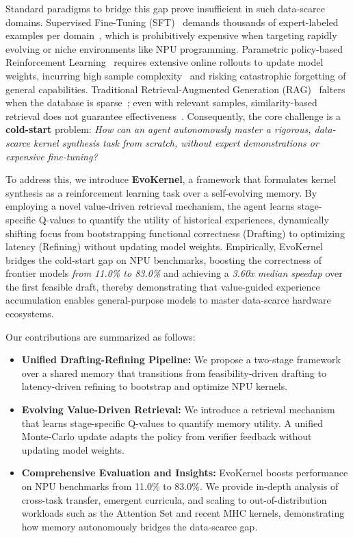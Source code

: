 \documentclass{article} %
\newcommand{\ourmethod}{EvoKernel\xspace}
\theoremstyle{definition}
\theoremstyle{remark}
\begin{document}
Standard paradigms to bridge this gap prove insufficient in such data-scarce domains. Supervised Fine-Tuning (SFT)~\citep{zhou2023lima, chung2024scaling} demands thousands of expert-labeled examples per domain~\citep{longpre2023flan}, which is prohibitively expensive when targeting rapidly evolving or niche environments like NPU programming. Parametric policy-based Reinforcement Learning~\citep{zhang2025settling, kakade2003sample} requires extensive online rollouts to update model weights, incurring high sample complexity~\citep{cao2024beyond, qi2025sample} and risking catastrophic forgetting of general capabilities. Traditional Retrieval-Augmented Generation (RAG)~\citep{lewis2020retrieval} falters when the database is sparse~\citep{contal2024ragsys, barnett2024seven}; even with relevant samples, similarity-based retrieval does not guarantee effectiveness~\citep{izacard2023atlas}. Consequently, the core challenge is a \textbf{cold-start} problem: \textit{How can an agent autonomously master a rigorous, data-scarce kernel synthesis task from scratch, without expert demonstrations or expensive fine-tuning?}

To address this, we introduce \textbf{\ourmethod}, a framework that formulates kernel synthesis as a reinforcement learning task over a self-evolving memory. By employing a novel value-driven retrieval mechanism, the agent learns stage-specific Q-values to quantify the utility of historical experiences, dynamically shifting focus from bootstrapping functional correctness (Drafting) to optimizing latency (Refining) without updating model weights. Empirically, EvoKernel bridges the cold-start gap on NPU benchmarks, boosting the correctness of frontier models \textit{from 11.0\% to 83.0\%} and achieving a \textit{3.60x median speedup} over the first feasible draft, thereby demonstrating that value-guided experience accumulation enables general-purpose models to master data-scarce hardware ecosystems. 


Our contributions are summarized as follows:
\begin{itemize}
    \item \textbf{Unified Drafting-Refining Pipeline:} We propose a two-stage framework over a shared memory that transitions from feasibility-driven drafting to latency-driven refining to bootstrap and optimize NPU kernels. 
    \item \textbf{Evolving Value-Driven Retrieval:} We introduce a retrieval mechanism that learns stage-specific Q-values to quantify memory utility. A unified Monte-Carlo update adapts the policy from verifier feedback without updating model weights. 
    \item \textbf{Comprehensive Evaluation and Insights:} EvoKernel boosts performance on NPU benchmarks from 11.0\% to 83.0\%. We provide in-depth analysis of cross-task transfer, emergent curricula, and scaling to out-of-distribution workloads such as the Attention Set and recent MHC kernels, demonstrating how memory autonomously bridges the data-scarce gap. 
\end{itemize}
\end{document}
